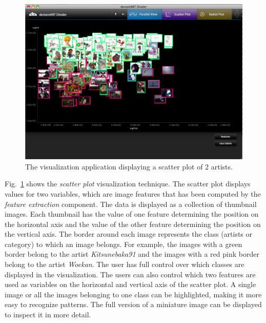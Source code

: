\begin{figure}[htb]
  \centering
  \includegraphics[width=1\linewidth]{img/visualization_scatter.png}
  \caption{The visualization application displaying a scatter plot of 2 artists.}
  \label{fig:visualization_scatter}
\end{figure}

Fig.~\ref{fig:visualization_scatter} shows the \textit{scatter plot} visualization technique.
The scatter plot displays values for two variables, which are image features that has been computed by the \textit{feature extraction} component.
The data is displayed as a collection of thumbnail images.
Each thumbnail has the value of one feature determining the position on the horizontal axis and the value of the other feature determining the position on the vertical axis.
The border around each image represents the class (artists or category) to which an image belongs.
For example, the images with a green border belong to the artist \textit{Kitsunebaka91} and the images with a red pink border belong to the artist \textit{Woekan}.
The user has full control over which classes are displayed in the visualization.
The users can also control which two features are used as variables on the horizontal and vertical axis of the scatter plot.
A single image or all the images belonging to one class can be highlighted, making it more easy to recognize patterns.
The full version of a miniature image can be displayed to inspect it in more detail.

